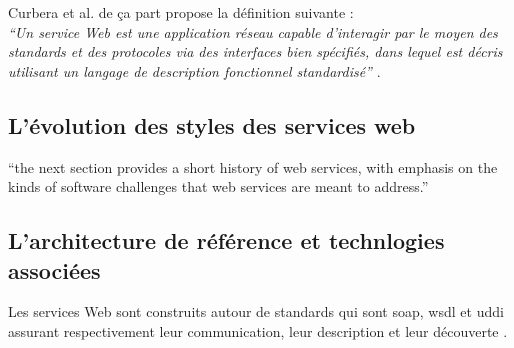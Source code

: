 	 


	Curbera et al. \cite{curbera2001web} de ça part propose la définition suivante :\\

	\emph{``Un service Web est une application réseau capable d'interagir par le moyen des standards et des protocoles 
	via des interfaces bien spécifiés, dans lequel est décris utilisant un langage de description fonctionnel
	standardisé''} .\\


    \subsection{L'évolution des styles des services web}
	``the next section provides a short history of web services, with emphasis on the kinds of software challenges
	that web services are meant to address.''

    \subsection{L'architecture de référence et technlogies associées}
    \cite{curbera2002unraveling} \cite{gottschalk2002introduction} \cite{WSA}

	Les services Web sont construits autour de standards qui sont \acrshort{soap}, \acrshort{wsdl} et \acrshort{uddi} 
	assurant respectivement leur communication, leur description et leur découverte .

